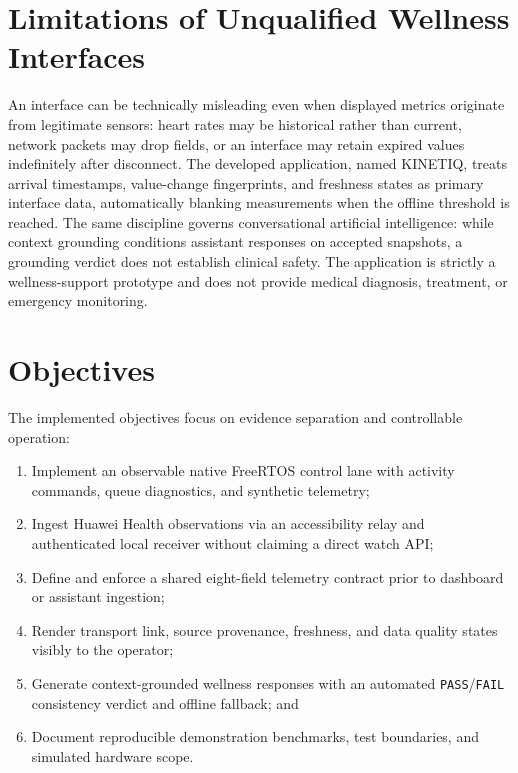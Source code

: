 \section{Limitations of Unqualified Wellness Interfaces}
An interface can be technically misleading even when displayed metrics originate from legitimate sensors: heart rates may be historical rather than current, network packets may drop fields, or an interface may retain expired values indefinitely after disconnect. The developed application, named KINETIQ, treats arrival timestamps, value-change fingerprints, and freshness states as primary interface data, automatically blanking measurements when the offline threshold is reached. The same discipline governs conversational artificial intelligence: while context grounding conditions assistant responses on accepted snapshots, a grounding verdict does not establish clinical safety. The application is strictly a wellness-support prototype and does not provide medical diagnosis, treatment, or emergency monitoring.

\section{Objectives}
The implemented objectives focus on evidence separation and controllable operation:
\begin{enumerate}[noitemsep,topsep=1pt]
  \item Implement an observable native FreeRTOS control lane with activity commands, queue diagnostics, and synthetic telemetry;
  \item Ingest Huawei Health observations via an accessibility relay and authenticated local receiver without claiming a direct watch API;
  \item Define and enforce a shared eight-field telemetry contract prior to dashboard or assistant ingestion;
  \item Render transport link, source provenance, freshness, and data quality states visibly to the operator;
  \item Generate context-grounded wellness responses with an automated \texttt{PASS}/\texttt{FAIL} consistency verdict and offline fallback; and
  \item Document reproducible demonstration benchmarks, test boundaries, and simulated hardware scope.
\end{enumerate}

